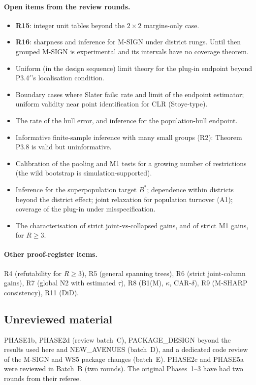 \paragraph{Open items from the review rounds.}
\begin{itemize}[nosep]
\item \textbf{R15}: integer unit tables beyond the $2\times2$ margins-only case.
\item \textbf{R16}: sharpness and inference for M-SIGN under district rungs. Until
then grouped M-SIGN is experimental and its intervals have no coverage theorem.
\item Uniform (in the design sequence) limit theory for the plug-in endpoint
beyond P3.4$'$'s localisation condition.
\item Boundary cases where Slater fails: rate and limit of the endpoint estimator;
uniform validity near point identification for CLR (Stoye-type).
\item The rate of the hull error, and inference for the population-hull endpoint.
\item Informative finite-sample inference with many small groups (R2): Theorem P3.8
is valid but uninformative.
\item Calibration of the pooling and M1 tests for a growing number of restrictions
(the wild bootstrap is simulation-supported).
\item Inference for the superpopulation target $B^*$; dependence within districts
beyond the district effect; joint relaxation for population turnover (A1);
coverage of the plug-in under misspecification.
\item The characterisation of strict joint-vs-collapsed gains, and of strict M1
gains, for $R\ge3$.
\end{itemize}

\paragraph{Other proof-register items.} R4 (refutability for $R\ge3$), R5 (general
spanning trees), R6 (strict joint-column gains), R7 (global N2 with estimated
$\tau$), R8 (B1(M), $\kappa$, CAR-$\delta$), R9 (M-SHARP consistency), R11 (DiD).

\subsection{Unreviewed material}

PHASE1b, PHASE2d (review batch~C), PACKAGE\_DESIGN beyond the results used here
and NEW\_AVENUES (batch~D), and a dedicated code review of the M-SIGN and WS5
package changes (batch~E). PHASE2c and PHASE5a were reviewed in Batch~B (two
rounds). The original Phases~1--3 have had two rounds from their referee.

